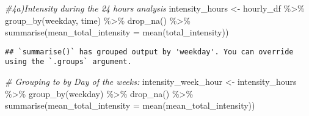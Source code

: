 \documentclass[
]{article}
\newenvironment{Shaded}{\begin{snugshade}}{\end{snugshade}}
\newcommand{\AttributeTok}[1]{\textcolor[rgb]{0.77,0.63,0.00}{#1}}
\newcommand{\CommentTok}[1]{\textcolor[rgb]{0.56,0.35,0.01}{\textit{#1}}}
\newcommand{\FunctionTok}[1]{\textcolor[rgb]{0.00,0.00,0.00}{#1}}
\newcommand{\NormalTok}[1]{#1}
\newcommand{\OtherTok}[1]{\textcolor[rgb]{0.56,0.35,0.01}{#1}}
\newcommand{\SpecialCharTok}[1]{\textcolor[rgb]{0.00,0.00,0.00}{#1}}
\begin{document}
\begin{Shaded}
\begin{Highlighting}[]
\CommentTok{\#4a)Intensity during the 24 hours analysis}
\NormalTok{intensity\_hours }\OtherTok{\textless{}{-}}\NormalTok{ hourly\_df }\SpecialCharTok{\%\textgreater{}\%}
  \FunctionTok{group\_by}\NormalTok{(weekday, time) }\SpecialCharTok{\%\textgreater{}\%}
  \FunctionTok{drop\_na}\NormalTok{() }\SpecialCharTok{\%\textgreater{}\%}
  \FunctionTok{summarise}\NormalTok{(}\AttributeTok{mean\_total\_intensity =} \FunctionTok{mean}\NormalTok{(total\_intensity))}
\end{Highlighting}
\end{Shaded}

\begin{verbatim}
## `summarise()` has grouped output by 'weekday'. You can override using the `.groups` argument.
\end{verbatim}

\begin{Shaded}
\begin{Highlighting}[]
\CommentTok{\# Grouping to by Day of the weeks:}
\NormalTok{intensity\_week\_hour }\OtherTok{\textless{}{-}}\NormalTok{ intensity\_hours }\SpecialCharTok{\%\textgreater{}\%}
  \FunctionTok{group\_by}\NormalTok{(weekday) }\SpecialCharTok{\%\textgreater{}\%}
  \FunctionTok{drop\_na}\NormalTok{() }\SpecialCharTok{\%\textgreater{}\%}
  \FunctionTok{summarise}\NormalTok{(}\AttributeTok{mean\_total\_intensity =} \FunctionTok{mean}\NormalTok{(mean\_total\_intensity))}
\end{Highlighting}
\end{Shaded}
\end{document}
